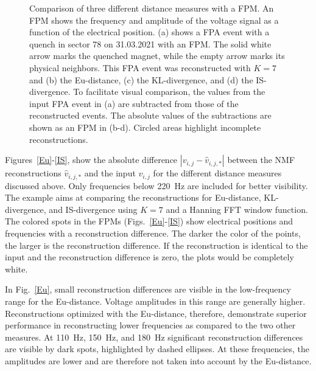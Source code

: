 \documentclass[lettersize,journal]{IEEEtran}
\begin{document}
\begin{figure}[ht!]
\def\scalesize{0.6}
\centering 
    \subfloat[$v_{i,j}$]{%
    \label{pfm}}
\centering 
    \subfloat[$|v_{i,j} - \hat{v}_{i,j,Eu}|$]{
    \label{Eu}}
\centering 
    \subfloat[$|v_{i,j} - \hat{v}_{i,j,KL}|$]{%
    \label{KL}}
\centering 
    \subfloat[$|v_{i,j} - \hat{v}_{i,j,IS}|$]{%
    \label{IS}}
\caption{Comparison of three different distance measures with a FPM. 
An FPM shows the frequency and amplitude of the voltage signal as a function of the electrical position. (a) shows a FPA event with a quench in sector 78 on 31.03.2021 with an FPM. The solid white arrow marks the quenched magnet, while the empty arrow marks its physical neighbors.
This FPA event was reconstructed with $K=7$ and (b) the Eu-distance, (c) the KL-divergence, and (d) the IS-divergence. 
To facilitate visual comparison, the values from the input FPA event in (a) are subtracted from those of the reconstructed events.
The absolute values of the subtractions are shown as an FPM in (b-d).
Circled areas highlight incomplete reconstructions.}
\label{reconstructions}
\end{figure}

Figures~\ref{Eu}-\ref{IS}, show the absolute difference $|v_{i,j} - \hat{v}_{i,j,*}|$ between the NMF reconstructions $\hat{v}_{i,j,*}$ and the input $v_{i,j}$ for the different distance measures discussed above. Only frequencies below 220~Hz are included for better visibility.
The example aims at comparing the reconstructions for Eu-distance, KL-divergence, and IS-divergence using $K=7$ and a Hanning FFT window function.
The colored spots in the FPMs (Figs.~\ref{Eu}-\ref{IS}) show electrical positions and frequencies with a reconstruction difference. The darker the color of the points, the larger is the reconstruction difference. If the reconstruction is identical to the input and the reconstruction difference is zero, the plots would be completely white.  


In Fig.~\ref{Eu}, small reconstruction differences are visible in the low-frequency range for the Eu-distance.
Voltage amplitudes in this range are generally higher.
Reconstructions optimized with the Eu-distance, therefore, demonstrate superior performance in reconstructing lower frequencies as compared to the two other measures. 
At 110~Hz, 150~Hz, and 180~Hz significant reconstruction differences are visible by dark spots, highlighted by dashed ellipses.
At these frequencies, the amplitudes are lower and are therefore not taken into account by the Eu-distance.
\end{document}
